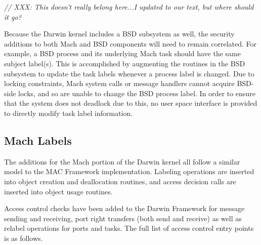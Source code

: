 \textit{// XXX: This doesn't really belong here...I updated to our text, but
where should it go?}

Because the Darwin kernel includes a BSD subsystem as well, the
security additions to both Mach and BSD components will need to
remain correlated. For example, a BSD process and its underlying
Mach task should have the same subject label(s). This is accomplished
by augmenting the routines in the BSD subsystem to update the task
labels whenever a process label is changed.  Due to locking
constraints, Mach system calls or message handlers cannot acquire
BSD-side locks, and so are unable to change the BSD process label.
In order to ensure that the system does not deadlock due to this,
no user space interface is provided to directly modify task label
information.


\subsection{Mach Labels}

The additions for the Mach portion of the Darwin kernel all follow a
similar model to the MAC Framework implementation. Labeling
operations are inserted into object creation and deallocation
routines, and access decision calls are inserted into object usage
routines.

Access control checks have been added to the Darwin Framework for
message sending and receiving, port right transfers (both send and
receive) as well as relabel operations for ports and tasks.  The
full list of access control entry points is as follows.

